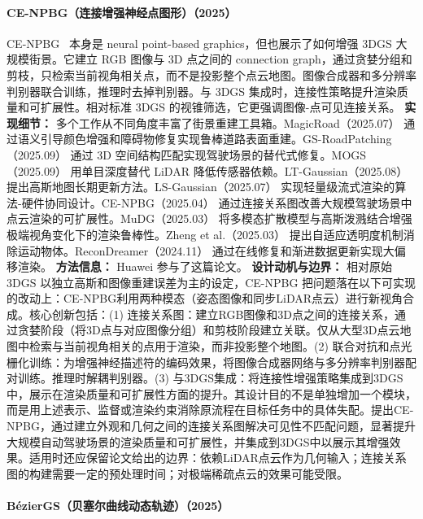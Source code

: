\paragraph{CE-NPBG（连接增强神经点图形）（2025）}
CE-NPBG~\cite{2504_19557} 本身是 neural point-based graphics，但也展示了如何增强 3DGS 大规模街景。它建立 RGB 图像与 3D 点之间的 connection graph，通过贪婪分组和剪枝，只检索当前视角相关点，而不是投影整个点云地图。图像合成器和多分辨率判别器联合训练，推理时去掉判别器。与 3DGS 集成时，连接性策略提升渲染质量和可扩展性。相对标准 3DGS 的视锥筛选，它更强调图像-点可见连接关系。
\textbf{实现细节：} 多个工作从不同角度丰富了街景重建工具箱。MagicRoad（2025.07） 通过语义引导颜色增强和障碍物修复实现鲁棒道路表面重建。GS-RoadPatching（2025.09） 通过 3D 空间结构匹配实现驾驶场景的替代式修复。MOGS（2025.09） 用单目深度替代 LiDAR 降低传感器依赖。LT-Gaussian（2025.08） 提出高斯地图长期更新方法。LS-Gaussian（2025.07） 实现轻量级流式渲染的算法-硬件协同设计。CE-NPBG（2025.04） 通过连接关系图改善大规模驾驶场景中点云渲染的可扩展性。MuDG（2025.03） 将多模态扩散模型与高斯泼溅结合增强极端视角变化下的渲染鲁棒性。Zheng et al.（2025.03） 提出自适应透明度机制消除运动物体。ReconDreamer（2024.11） 通过在线修复和渐进数据更新实现大偏移渲染。
\textbf{方法信息：} Huawei 参与了这篇论文。
\textbf{设计动机与边界：} 相对原始 3DGS 以独立高斯和图像重建误差为主的设定，CE-NPBG 把问题落在以下可实现的改动上：CE-NPBG利用两种模态（姿态图像和同步LiDAR点云）进行新视角合成。核心创新包括：(1) 连接关系图：建立RGB图像和3D点之间的连接关系，通过贪婪阶段（将3D点与对应图像分组）和剪枝阶段建立关联。仅从大型3D点云地图中检索与当前视角相关的点用于渲染，而非投影整个地图。(2) 联合对抗和点光栅化训练：为增强神经描述符的编码效果，将图像合成器网络与多分辨率判别器配对训练。推理时解耦判别器。(3) 与3DGS集成：将连接性增强策略集成到3DGS中，展示在渲染质量和可扩展性方面的提升。其设计目的不是单独增加一个模块，而是用上述表示、监督或渲染约束消除原流程在目标任务中的具体失配。提出CE-NPBG，通过建立外观和几何之间的连接关系图解决可见性不匹配问题，显著提升大规模自动驾驶场景的渲染质量和可扩展性，并集成到3DGS中以展示其增强效果。适用时还应保留论文给出的边界：依赖LiDAR点云作为几何输入；连接关系图的构建需要一定的预处理时间；对极端稀疏点云的效果可能受限。
\paragraph{BézierGS（贝塞尔曲线动态轨迹）（2025）}

